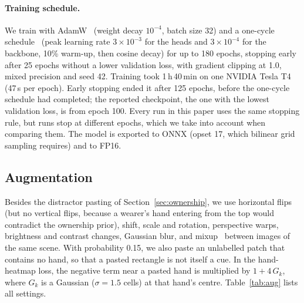 \paragraph{Training schedule.} We train with AdamW~\cite{loshchilov2019decoupled} (weight decay $10^{-4}$, batch size 32) and a one-cycle schedule~\cite{smith2019super} (peak learning rate $3\times10^{-3}$ for the heads and $3\times10^{-4}$ for the backbone, 10\% warm-up, then cosine decay) for up to 180 epochs, stopping early after 25 epochs without a lower validation loss, with gradient clipping at 1.0, mixed precision and seed 42. Training took 1\,h\,40\,min on one NVIDIA Tesla T4 (47\,s per epoch). Early stopping ended it after 125 epochs, before the one-cycle schedule had completed; the reported checkpoint, the one with the lowest validation loss, is from epoch 100. Every run in this paper uses the same stopping rule, but runs stop at different epochs, which we take into account when comparing them. The model is exported to ONNX (opset 17, which bilinear grid sampling requires) and to FP16.

\subsection{Augmentation}\label{app:aug}
Besides the distractor pasting of Section~\ref{sec:ownership}, we use horizontal flips (but no vertical flips, because a wearer's hand entering from the top would contradict the ownership prior), shift, scale and rotation, perspective warps, brightness and contrast changes, Gaussian blur, and mixup~\cite{zhang2018mixup} between images of the same scene. With probability 0.15, we also paste an unlabelled patch that contains no hand, so that a pasted rectangle is not itself a cue. In the hand-heatmap loss, the negative term near a pasted hand is multiplied by $1+4\,G_k$, where $G_k$ is a Gaussian ($\sigma{=}1.5$ cells) at that hand's centre. Table~\ref{tab:aug} lists all settings.

